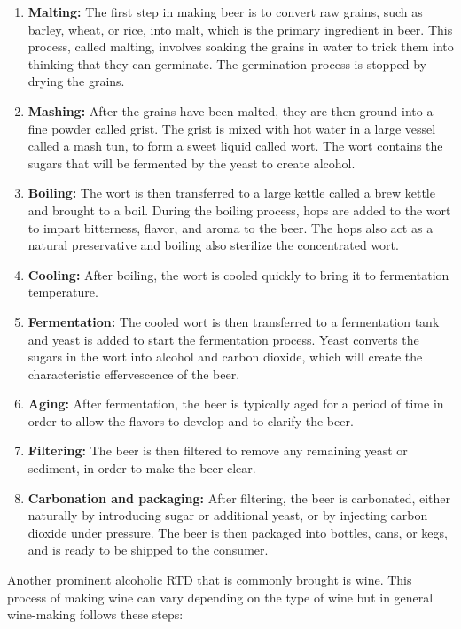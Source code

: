 \begin{enumerate}
  \item \textbf{Malting:} The first step in making beer is to convert raw grains, such as barley, wheat, or rice, into malt, which is the primary ingredient in beer. This process, called malting, involves soaking the grains in water to trick them into thinking that they can germinate. The germination process is stopped by drying the grains.
  \item \textbf{Mashing:} After the grains have been malted, they are then ground into a fine powder called grist. The grist is mixed with hot water in a large vessel called a mash tun, to form a sweet liquid called wort. The wort contains the sugars that will be fermented by the yeast to create alcohol.
  \item \textbf{Boiling: }The wort is then transferred to a large kettle called a brew kettle and brought to a boil. During the boiling process, hops are added to the wort to impart bitterness, flavor, and aroma to the beer. The hops also act as a natural preservative and boiling also sterilize the concentrated wort.
  \item \textbf{Cooling: } After boiling, the wort is cooled quickly to bring it to fermentation temperature.
  \item \textbf{Fermentation: }The cooled wort is then transferred to a fermentation tank and yeast is added to start the fermentation process. Yeast converts the sugars in the wort into alcohol and carbon dioxide, which will create the characteristic effervescence of the beer.
  \item \textbf{Aging: }After fermentation, the beer is typically aged for a period of time in order to allow the flavors to develop and to clarify the beer.
  \item \textbf{Filtering: }The beer is then filtered to remove any remaining yeast or sediment, in order to make the beer clear.
  \item \textbf{Carbonation and packaging: }After filtering, the beer is carbonated, either naturally by introducing sugar or additional yeast, or by injecting carbon dioxide under pressure. The beer is then packaged into bottles, cans, or kegs, and is ready to be shipped to the consumer. 
\end{enumerate}
Another prominent alcoholic RTD that is commonly brought is wine. This process of making wine can vary depending on the type of wine but in general wine-making follows these steps: 

